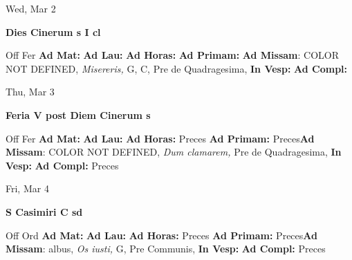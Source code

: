 \documentclass[10pt]{memoir}
\begin{document}
\begin{center}
\begin{minipage}{3.5in}
\vspace{2em}
\begin{center}Wed, Mar 2
\end{center}
\textbf{ \large Dies Cinerum
\textnormal{\normalsize s I cl}}

\begin{justify}Off Fer
\textbf{Ad Mat: }
\textbf{Ad Lau: }
\textbf{Ad Horas: }
\textbf{Ad Primam: }\textbf{Ad Missam}: COLOR NOT DEFINED, \textit{Misereris,} G, C, Pre de Quadragesima, 
\textbf{In Vesp: }
\textbf{Ad Compl: }
\end{justify}
\end{minipage}
\end{center}

\begin{center}
\begin{minipage}{3.5in}
\vspace{2em}
\begin{center}Thu, Mar 3
\end{center}
\textbf{ \large Feria V post Diem Cinerum
\textnormal{\normalsize s}}

\begin{justify}Off Fer
\textbf{Ad Mat: }
\textbf{Ad Lau: }
\textbf{Ad Horas: }Preces
\textbf{Ad Primam: }Preces\textbf{Ad Missam}: COLOR NOT DEFINED, \textit{Dum clamarem,} Pre de Quadragesima, 
\textbf{In Vesp: }
\textbf{Ad Compl: }Preces
\end{justify}
\end{minipage}
\end{center}

\begin{center}
\begin{minipage}{3.5in}
\vspace{2em}
\begin{center}Fri, Mar 4
\end{center}
\textbf{ \large S Casimiri C
\textnormal{\normalsize sd}}

\begin{justify}Off Ord
\textbf{Ad Mat: }
\textbf{Ad Lau: }
\textbf{Ad Horas: }Preces
\textbf{Ad Primam: }Preces\textbf{Ad Missam}: albus, \textit{Os iusti,} G, Pre Communis, 
\textbf{In Vesp: }
\textbf{Ad Compl: }Preces
\end{justify}
\end{minipage}
\end{center}
\end{document}

